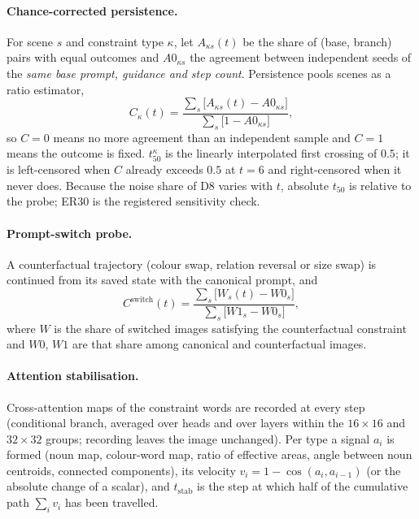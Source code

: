 \paragraph{Chance-corrected persistence.} For scene $s$ and constraint type $\kappa$, let $A_{\kappa s}(t)$ be the share of (base, branch) pairs with equal outcomes and $A0_{\kappa s}$ the agreement between independent seeds of the \emph{same base prompt, guidance and step count}. Persistence pools scenes as a ratio estimator,
\begin{equation}
C_\kappa(t)=\frac{\sum_s\big[A_{\kappa s}(t)-A0_{\kappa s}\big]}{\sum_s\big[1-A0_{\kappa s}\big]},
\end{equation}
so $C=0$ means no more agreement than an independent sample and $C=1$ means the outcome is fixed. $t_{50}^\kappa$ is the linearly interpolated first crossing of $0.5$; it is left-censored when $C$ already exceeds $0.5$ at $t=6$ and right-censored when it never does. Because the noise share of D8 varies with $t$, absolute $t_{50}$ is relative to the probe; ER30 is the registered sensitivity check.

\paragraph{Prompt-switch probe.} A counterfactual trajectory (colour swap, relation reversal or size swap) is continued from its saved state with the canonical prompt, and
\begin{equation}
C^{\mathrm{switch}}(t)=\frac{\sum_s\big[W_s(t)-W0_s\big]}{\sum_s\big[W1_s-W0_s\big]},
\end{equation}
where $W$ is the share of switched images satisfying the counterfactual constraint and $W0$, $W1$ are that share among canonical and counterfactual images.

\paragraph{Attention stabilisation.} Cross-attention maps of the constraint words are recorded at every step (conditional branch, averaged over heads and over layers within the $16\times16$ and $32\times32$ groups; recording leaves the image unchanged). Per type a signal $a_i$ is formed (noun map, colour-word map, ratio of effective areas, angle between noun centroids, connected components), its velocity $v_i=1-\cos(a_i,a_{i-1})$ (or the absolute change of a scalar), and $t_{\mathrm{stab}}$ is the step at which half of the cumulative path $\sum_i v_i$ has been travelled.

